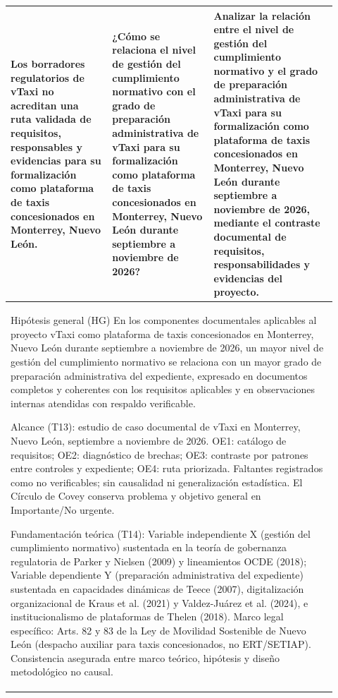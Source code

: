 {\begin{landscape}
\begin{longtable}{@{}p{0.29\linewidth}p{0.29\linewidth}p{0.34\linewidth}@{}}
Los borradores regulatorios de vTaxi no acreditan una ruta validada de requisitos, responsables y evidencias para su formalización como plataforma de taxis concesionados en Monterrey, Nuevo León. & ¿Cómo se relaciona el nivel de gestión del cumplimiento normativo con el grado de preparación administrativa de vTaxi para su formalización como plataforma de taxis concesionados en Monterrey, Nuevo León durante septiembre a noviembre de 2026? & Analizar la relación entre el nivel de gestión del cumplimiento normativo y el grado de preparación administrativa de vTaxi para su formalización como plataforma de taxis concesionados en Monterrey, Nuevo León durante septiembre a noviembre de 2026, mediante el contraste documental de requisitos, responsabilidades y evidencias del proyecto.\\
\midrule
\multicolumn{3}{p{0.92\linewidth}}{Hipótesis general (HG)
En los componentes documentales aplicables al proyecto vTaxi como plataforma de taxis concesionados en Monterrey, Nuevo León durante septiembre a noviembre de 2026, un mayor nivel de gestión del cumplimiento normativo se relaciona con un mayor grado de preparación administrativa del expediente, expresado en documentos completos y coherentes con los requisitos aplicables y en observaciones internas atendidas con respaldo verificable.\par Alcance (T13): estudio de caso documental de vTaxi en Monterrey, Nuevo León, septiembre a noviembre de 2026. OE1: catálogo de requisitos; OE2: diagnóstico de brechas; OE3: contraste por patrones entre controles y expediente; OE4: ruta priorizada. Faltantes registrados como no verificables; sin causalidad ni generalización estadística. El Círculo de Covey conserva problema y objetivo general en Importante/No urgente.\par Fundamentación teórica (T14): Variable independiente X (gestión del cumplimiento normativo) sustentada en la teoría de gobernanza regulatoria de Parker y Nielsen (2009) y lineamientos OCDE (2018); Variable dependiente Y (preparación administrativa del expediente) sustentada en capacidades dinámicas de Teece (2007), digitalización organizacional de Kraus et al. (2021) y Valdez-Juárez et al. (2024), e institucionalismo de plataformas de Thelen (2018). Marco legal específico: Arts. 82 y 83 de la Ley de Movilidad Sostenible de Nuevo León (despacho auxiliar para taxis concesionados, no ERT/SETIAP). Consistencia asegurada entre marco teórico, hipótesis y diseño metodológico no causal.}\\
\bottomrule\end{longtable}
\endgroup

\end{landscape}}
